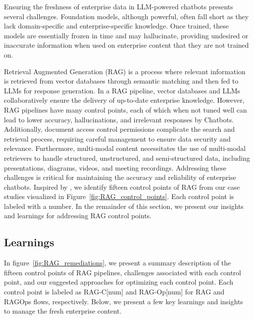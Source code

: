 \documentclass[sigconf]{acmart}
\begin{document}
Ensuring the freshness of enterprise data in LLM-powered chatbots presents several challenges. Foundation models, although powerful, often fall short as they lack domain-specific and enterprise-specific knowledge. Once trained, these models are essentially frozen in time and may hallucinate, providing undesired or inaccurate information when used on enterprise content that they are not trained on. 

Retrieval Augmented Generation (RAG) is a process where relevant information is retrieved from vector databases through semantic matching and then fed to LLMs for response generation. In a RAG pipeline, vector databases and LLMs collaboratively ensure the delivery of up-to-date enterprise knowledge. However, RAG pipelines have many control points, each of which when not tuned well can lead to lower accuracy, hallucinations, and irrelevant responses by Chatbots. Additionally, document access control permissions complicate the search and retrieval process, requiring careful management to ensure data security and relevance. Furthermore, multi-modal content necessitates the use of multi-modal retrievers to handle structured, unstructured, and semi-structured data, including presentations, diagrams, videos, and meeting recordings. Addressing these challenges is critical for maintaining the accuracy and reliability of enterprise chatbots. Inspired by \cite{barnett2024seven}, we identify fifteen control points of RAG from our case studies visualized in Figure~\ref{fig:RAG_control_points}. Each control point is labeled with a number. In the remainder of this section, we present our insights and learnings for addressing RAG control points.

\subsection{Learnings}
In figure~\ref{fig:RAG_remediations}, we present a summary description of the fifteen control points of RAG pipelines, challenges associated with each control point, and our suggested approaches for optimizing each control point. Each control point is labeled as RAG-C[num] and RAG-Op[num] for RAG and RAGOps flows, respectively. Below, we present a few key learnings and insights to manage the fresh enterprise content. 
\end{document}
